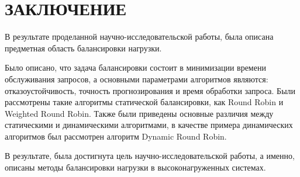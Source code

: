 \chapter*{ЗАКЛЮЧЕНИЕ}

В результате проделанной научно-исследовательской работы, была описана предметная область балансировки нагрузки. 

Было описано, что задача балансировки состоит в минимизации времени обслуживания запросов, а основными параметрами алгоритмов являются: отказоустойчивость, точность прогнозирования и время обработки запроса. Были рассмотрены такие алгоритмы статической балансировки, как Round Robin и Weighted Round Robin. Также были приведены основные различия между статическими и динамическими алгоритмами, в качестве примера динамических алгоритмов был рассмотрен алгоритм Dynamic Round Robin.

В результате, была достигнута цель научно-исследовательской работы, а именно, описаны методы балансировки нагрузки в высоконагруженных системах.